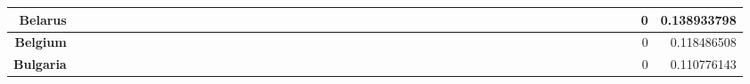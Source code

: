 \documentclass[a4paper,11pt]{report}
\begin{document}
\begin{appendices}
\begin{landscape}
\begin{longtable}{r|r|r|r|r|r|r|r|r|r|r|r|r|r|r|r|r|r|r|r|r|r|r|r|r|r|r|r|r|r|r|r|r|r|r|r|r|r|r|r|r|r|r|r|r|r|r|r|}
\multicolumn{1}{|r|}{\textbf{Belarus}}               &                  &                  &                  &                     &                  &                  &                                &                   &                  &                 &                  &                  &                           &                  &                 &                  &                  &                 &                  &                  &                  &                 &                &                 &                    &                &                  &                 &                 &                   &                  &                 &                     &                 &                   &                   &                &                 &                      &                          &                 &                  &                         &                 &                & 0                        & 0.138933798        \\ \hline
\multicolumn{1}{|r|}{\textbf{Belgium}}               &                  &                  &                  &                     &                  &                  &                                &                   &                  &                 &                  &                  &                           &                  &                 &                  &                  &                 &                  &                  &                  &                 &                &                 &                    &                &                  &                 &                 &                   &                  &                 &                     &                 &                   &                   &                &                 &                      &                          &                 &                  &                         &                 &                & 0                        & 0.118486508        \\ \hline
\multicolumn{1}{|r|}{\textbf{Bulgaria}}              &                  &                  &                  &                     &                  &                  &                                &                   &                  &                 &                  &                  &                           &                  &                 &                  &                  &                 &                  &                  &                  &                 &                &                 &                    &                &                  &                 &                 &                   &                  &                 &                     &                 &                   &                   &                &                 &                      &                          &                 &                  &                         &                 &                & 0                        & 0.110776143        \\ \hline

\end{longtable}
\end{landscape}
\end{appendices}
\end{document}
